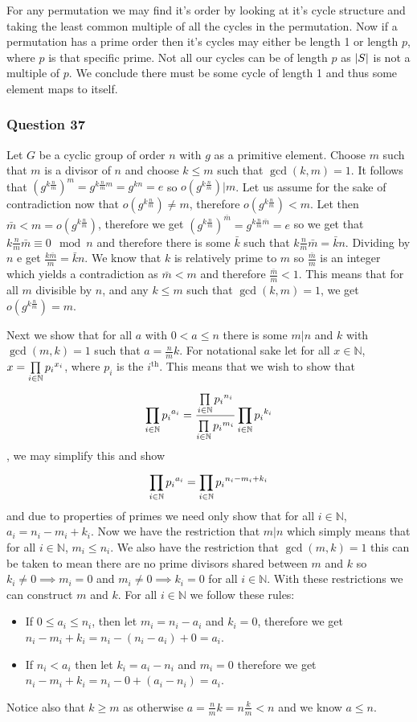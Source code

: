 \documentclass{article}
\begin{document}
For any permutation we may find it's order by looking at it's cycle structure and taking the least common multiple of all the cycles in the permutation. Now if a permutation has a prime order then it's cycles may either be length 1 or length $p$, where $p$ is that specific prime. Not all our cycles can be of length $p$ as $\left| {S} \right|$ is not a multiple of $p$. We conclude there must be some cycle of length 1 and thus some element maps to itself.

\subsubsection{Question 37}
Let $G$ be a cyclic group of order $n$ with $g$ as a primitive element. Choose $m$ such that $m$ is a divisor of $n$ and choose $k \le m$ such that $\gcd(k,m) = 1$. It follows that $\left(g^{k\frac nm}\right)^m = g^{k\frac nmm} = g^{kn} = e$ so $o\left(g^{k\frac nm}\right) | m$. Let us assume for the sake of contradiction now that $o\left(g^{k\frac nm}\right) \not= m$, therefore $o\left(g^{k\frac nm}\right) < m$. Let then $\bar m < m = o\left(g^{k\frac nm}\right)$, therefore we get $\left(g^{k\frac nm}\right)^{\bar m} = g^{k\frac nm \bar m} = e$ so we get that $k\frac nm\bar m \equiv 0 \mod n$ and therefore there is some $\bar k$ such that $k\frac nm\bar m = \bar kn$. Dividing by $n$ e get $\frac {k\bar m}m = \bar kn$. We know that $k$ is relatively prime to $m$ so $\frac{\bar m}m$ is an integer which yields a contradiction as $\bar m < m$ and therefore $\frac{\bar m}{m} < 1$. This means that for all $m$ divisible by $n$, and any $k \le m$ such that $\gcd(k,m) = 1$, we get $o\left(g^{k\frac nm}\right) = m$.

Next we show that for all $a$ with $0 < a \le n$ there is some $m | n$ and $k$ with $\gcd(m,k) = 1$ such that $a = \frac nmk$. For notational sake let for all $x \in\mathbb N$, $x = \prod\limits_{{i}\in\mathbb N}^{} {{p_{i}}^{{x}_{i}}} $, where $p_i$ is the $i^{\text{th}}$. This means that we wish to show that $$\prod\limits_{{i}\in\mathbb N}^{} {{p_{i}}^{{a}_{i}}}  = \frac{\prod\limits_{{i}\in\mathbb N}^{} {{p_{i}}^{{n}_{i}}} }{\prod\limits_{{i}\in\mathbb N}^{} {{p_{i}}^{{m}_{i}}} } \prod\limits_{{i}\in\mathbb N}^{} {{p_{i}}^{{k}_{i}}} $$, we may simplify this and show $$\prod\limits_{{i}\in\mathbb N}^{} {{p_{i}}^{{a}_{i}}}  = \prod\limits_{i\in\mathbb N}^{} {{p_i}^{n_i-m_i+k_i}} $$ and due to properties of primes we need only show that for all $i\in\mathbb N$, $a_i = n_i-m_i+k_i$. Now we have the restriction that $m|n$ which simply means that for all $i\in\mathbb N$, $m_i \le n_i$. We also have the restriction that $\gcd(m,k) = 1$ this can be taken to mean there are no prime divisors shared between $m$ and $k$ so $k_i\not=0\implies m_i = 0$ and $m_i\not=0\implies k_i=0$ for all $i\in\mathbb N$. With these restrictions we can construct $m$ and $k$. For all $i\in\mathbb N$ we follow these rules:
\begin{itemize}
	\item If $0\le a_i \le n_i$, then let $m_i = n_i - a_i$ and $k_i = 0$, therefore we get $n_i-m_i+k_i = n_i - (n_i-a_i) + 0 = a_i$.
	\item If $n_i < a_i$ then let $k_i = a_i - n_i$ and $m_i = 0$ therefore we get $n_i-m_i+k_i = n_i-0+(a_i-n_i) = a_i$.
\end{itemize}
Notice also that $k \ge m$ as otherwise $a = \frac nmk = n \frac km < n$ and we know $a \le n$.
\end{document}
